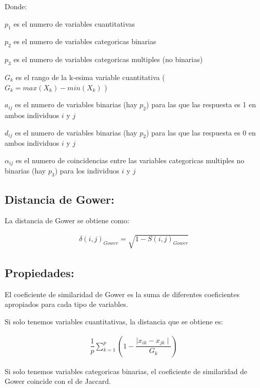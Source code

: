 \documentclass[12pt]{report} %
\begin{document}
Donde:

$p_1$ es el numero de variables cuantitativas

$p_2$ es el numero de variables categoricas binarias

$p_3$ es el numero de variables categoricas multiples (no binarias)

$G_k$ es el rango de la k-esima variable cuantitativa ( $G_k = max(X_k) - min(X_k)$ )

$a_{ij}$ es el numero de variables binarias (hay $p_2$) para las que las respuesta es 1 en ambos individuos $i$ y $j$

$d_{ij}$ es el numero de variables binarias (hay $p_2$) para las que las respuesta es 0 en ambos individuos $i$ y $j$

$\alpha_{ij}$ es el numero de coincidencias entre las variables categoricas multiples no binarias (hay $p_3$) para los individuos $i$ y $j$


\subsection{Distancia de Gower:}

\begin{tcolorbox}[toptitle=2mm,title=  Distancia de Gower:   ]
La distancia de Gower se obtiene como:

\begin{gather*}
\delta(i,j)_{Gower} = \sqrt{1 - S(i,j)_{Gower}} 
\end{gather*}

\end{tcolorbox}

\newpage
\subsection{Propiedades:}

El coeficiente de similaridad de Gower es la suma de diferentes coeficientes apropiados para cada tipo de variables.

Si solo tenemos variables cuantitativas, la distancia que se obtiene es:

\begin{gather*}
\dfrac{1}{p} \sum_{k=1}^{p } \left(1- \dfrac{\mid x_{ik} - x_{jk} \mid}{G_k} \right)
\end{gather*}

Si solo tenemos variables categoricas binarias, el coeficiente de similaridad de Gower coincide con el de Jaccard.
\end{document}

